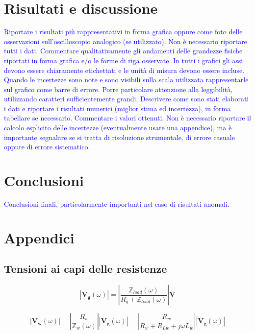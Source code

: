 \documentclass[12pt,italian]{article}
\newcommand{\prof}[1]{\textcolor{blue}{#1}}
\begin{document}
\section*{Risultati e discussione}
\prof{ Riportare i risultati più rappresentativi in forma grafica oppure come
  foto delle osservazioni sull'oscilloscopio analogico (se utilizzato). Non è
  necessario riportare tutti i dati. Commentare qualitativamente gli andamenti
  delle grandezze fisiche riportati in forma grafica e/o le forme di riga
  osservate. In tutti i grafici gli assi devono essere chiaramente etichettati e
  le unità di misura devono essere incluse. Quando le incertezze sono note e
  sono visibili sulla scala utilizzata rappresentarle sul grafico come barre di
  errore. Porre particolare attenzione alla leggibilità, utilizzando caratteri
  sufficientemente grandi. Descrivere come sono stati elaborati i dati e
  riportare i risultati numerici (miglior stima ed incertezza), in forma
  tabellare se necessario. Commentare i valori ottenuti. Non è necessario
  riportare il calcolo esplicito delle incertezze (eventualmente usare una
  appendice), ma è importante segnalare se si tratta di risoluzione strumentale,
  di errore casuale oppure di errore sistematico. }

\section*{Conclusioni}
\prof{Conclusioni finali, particolarmente importanti nel caso di risultati
  anomali.}

\appendix
\section{Appendici}
\subsection{Tensioni ai capi delle resistenze}
\label{sec:tensioni}
\begin{equation}
  \left| \mathbf{V_{g}}(\omega) \right| = \left| \frac{\mathbb{Z}_{load}(\omega)}
  {R_{g}+\mathbb{Z}_{load}(\omega)}\right| \mathbf{V}
\end{equation}

\begin{equation}
  \left| \mathbf{V_{w}}(\omega) \right| = \left| \frac{R_{w}}
  {\mathbb{Z}_{w}(\omega)}\right|\left| \mathbf{V_{g}}(\omega) \right| = \left| \frac{R_{w}}
  {R_{w}+R_{Lw} + j \omega L_w}\right|\left| \mathbf{V_{g}}(\omega) \right|
\end{equation}
\end{document}
